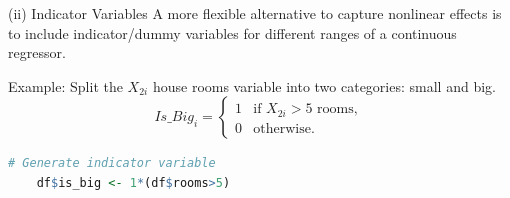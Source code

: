 \documentclass[11pt, aspectratio = 169]{beamer}
\begin{document}
\begin{frame}[fragile]{(ii) Indicator Variables}
A more flexible alternative to capture \alert{nonlinear effects} is to include indicator/dummy variables for different ranges of a continuous regressor.
\pause

Example: Split the $X_{2i}$ house rooms variable into two categories: small and big.
\[
Is\_Big_i  =
\begin{cases}
  1 & \text{if } X_{2i} > 5 \text{ rooms},\\
  0 & \text{otherwise.}
\end{cases}
\]
\pause
\begin{lstlisting}[language=R]
    # Generate indicator variable
    df$is_big <- 1*(df$rooms>5)
\end{lstlisting}
\end{frame}

\end{document}
